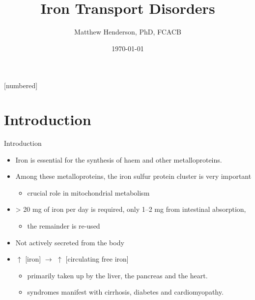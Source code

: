 \documentclass[presentation, smaller]{beamer}
\author{Matthew Henderson, PhD, FCACB}
\date{\today}
\title{Iron Transport Disorders}
\institute[NSO]{Newborn Screening Ontario | The University of Ottawa}
\begin{document}
\maketitle


\vspace{220pt}
\beamertemplatenavigationsymbolsempty
{}[numbered]

\section{Introduction}
\label{sec:orgfa67745}
\begin{frame}[label={sec:org5656c8b}]{Introduction}
\begin{itemize}
\item Iron is essential for the synthesis of haem and other
metalloproteins.
\item Among these metalloproteins, the iron sulfur protein cluster is very important
\begin{itemize}
\item crucial role in mitochondrial metabolism
\end{itemize}
\item \textgreater{} 20 mg of iron per day is required, only 1–2 mg from intestinal absorption,
\begin{itemize}
\item the remainder is re-used
\end{itemize}
\item Not actively secreted from the body
\item \(\uparrow\) [iron] \(\to\) \(\uparrow\) [circulating free iron]
\begin{itemize}
\item primarily taken up by the liver, the pancreas and the heart.
\item syndromes manifest with cirrhosis, diabetes and cardiomyopathy.
\end{itemize}
\end{itemize}
\end{frame}
\end{document}
